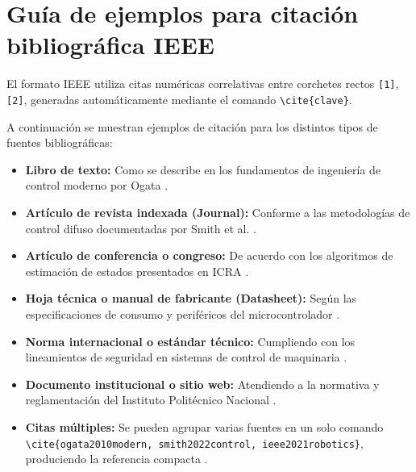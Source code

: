 
\section{Guía de ejemplos para citación bibliográfica IEEE}
\label{sec:ejemplo-citas}

El formato IEEE utiliza citas numéricas correlativas entre corchetes rectos \texttt{[1]}, \texttt{[2]}, generadas automáticamente mediante el comando \texttt{\textbackslash cite\{clave\}}.

A continuación se muestran ejemplos de citación para los distintos tipos de fuentes bibliográficas:

\begin{itemize}
    \item \textbf{Libro de texto:} Como se describe en los fundamentos de ingeniería de control moderno por Ogata \cite{ogata2010modern}.
    \item \textbf{Artículo de revista indexada (Journal):} Conforme a las metodologías de control difuso documentadas por Smith et al. \cite{smith2022control}.
    \item \textbf{Artículo de conferencia o congreso:} De acuerdo con los algoritmos de estimación de estados presentados en ICRA \cite{ieee2021robotics}.
    \item \textbf{Hoja técnica o manual de fabricante (Datasheet):} Según las especificaciones de consumo y periféricos del microcontrolador \cite{arizona2023embedded}.
    \item \textbf{Norma internacional o estándar técnico:} Cumpliendo con los lineamientos de seguridad en sistemas de control de maquinaria \cite{iso2018safety}.
    \item \textbf{Documento institucional o sitio web:} Atendiendo a la normativa y reglamentación del Instituto Politécnico Nacional \cite{ipn2025normativa}.
    \item \textbf{Citas múltiples:} Se pueden agrupar varias fuentes en un solo comando \texttt{\textbackslash cite\{ogata2010modern, smith2022control, ieee2021robotics\}}, produciendo la referencia compacta \cite{ogata2010modern, smith2022control, ieee2021robotics}.
\end{itemize}
